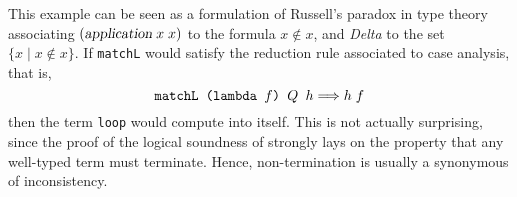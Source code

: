 \documentclass[11pt]{article}
\begin{document}
\noindent This example can be seen as a formulation of Russell's
paradox in type theory associating $(\textsl{application}\;x\;x)$ to the
formula $x\not\in x$, and \textsl{Delta} to the set $\{ x \mid
x\not\in x\}$. If \texttt{matchL} would satisfy the reduction rule
associated to case analysis, that is, 
$$ \mbox{\texttt{matchL (lambda $f$) $Q$ $h$}} \Longrightarrow h\;f$$
then the term \texttt{loop}
would compute into itself.  This is not actually surprising, since the
proof of the logical soundness of {\coq} strongly lays on the property
that any well-typed term must terminate. Hence, non-termination is
usually a synonymous of inconsistency.

%
\end{document}

